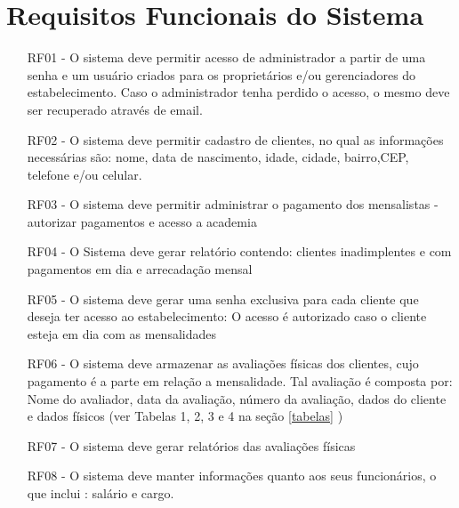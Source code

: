 





\section{Requisitos Funcionais do Sistema}
\label{secrf}
\begin{itemize}

\item[RF01 -]O sistema deve permitir acesso de administrador a partir de uma senha e um usuário criados para os proprietários e/ou gerenciadores do estabelecimento. Caso o administrador tenha perdido o acesso, o mesmo deve ser recuperado através de email.
\item[RF02 -] O sistema deve permitir cadastro de clientes, no qual as informações necessárias são: nome, data de nascimento, idade, cidade, bairro,CEP, telefone e/ou celular.
\item[RF03 -] O sistema deve permitir administrar o pagamento dos mensalistas - autorizar pagamentos e acesso a academia
\item[RF04 -] O Sistema deve gerar relatório contendo: clientes inadimplentes e com pagamentos em dia e arrecadação mensal
\item[RF05 -] O sistema deve gerar uma senha exclusiva para cada cliente que deseja ter acesso ao estabelecimento: O acesso é autorizado caso o cliente esteja em dia com as mensalidades
\item[RF06 -] O sistema deve armazenar as avaliações físicas dos clientes, cujo pagamento é a parte em relação a mensalidade. Tal avaliação é composta por: Nome do avaliador, data da avaliação, número da avaliação, dados do cliente e dados físicos (ver Tabelas 1, 2, 3 e 4 na seção \ref{tabelas} ) 
\item[RF07 - ] O sistema deve gerar relatórios das avaliações físicas
\item[RF08 - ] O sistema deve manter informações quanto aos seus funcionários, o que inclui : salário e cargo.


\end{itemize}


